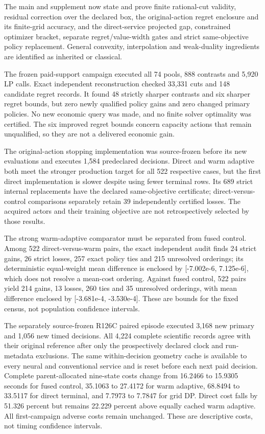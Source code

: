 The main and supplement now state and prove finite rational-cut validity, residual correction over the declared box, the original-action regret enclosure and its finite-grid accuracy, and the direct-service projected gap, constrained optimizer bracket, separate regret/value-width gates and strict same-objective policy replacement. General convexity, interpolation and weak-duality ingredients are identified as inherited or classical.\par
The frozen paid-support campaign executed all 74 pools, 888 contrasts and 5,920 LP calls. Exact independent reconstruction checked 33,331 cuts and 148 candidate regret records. It found 48 strictly sharper contrasts and six sharper regret bounds, but zero newly qualified policy gains and zero changed primary policies. No new economic query was made, and no finite solver optimality was certified. The six improved regret bounds concern capacity actions that remain unqualified, so they are not a delivered economic gain.\par
The original-action stopping implementation was source-frozen before its new evaluations and executes 1,584 predeclared decisions. Direct and warm adaptive both meet the stronger production target for all 522 respective cases, but the first direct implementation is slower despite using fewer terminal rows. Its 689 strict internal replacements have the declared same-objective certificate; direct-versus-control comparisons separately retain 39 independently certified losses. The acquired actors and their training objective are not retrospectively selected by those results.\par
The strong warm-adaptive comparator must be separated from fused control. Among 522 direct-versus-warm pairs, the exact independent audit finds 24 strict gains, 26 strict losses, 257 exact policy ties and 215 unresolved orderings; its deterministic equal-weight mean difference is enclosed by [-7.002e-6, 7.125e-6], which does not resolve a mean-cost ordering. Against fused control, 522 pairs yield 214 gains, 13 losses, 260 ties and 35 unresolved orderings, with mean difference enclosed by [-3.681e-4, -3.530e-4]. These are bounds for the fixed census, not population confidence intervals.\par
The separately source-frozen R126C paired episode executed 3,168 new primary and 1,056 new timed decisions. All 4,224 complete scientific records agree with their original reference after only the prospectively declared clock and run-metadata exclusions. The same within-decision geometry cache is available to every neural and conventional service and is reset before each next paid decision. Complete parent-allocated nine-state costs change from 16.2466 to 15.9305 seconds for fused control, 35.1063 to 27.4172 for warm adaptive, 68.8494 to 33.5117 for direct terminal, and 7.7973 to 7.7847 for grid DP. Direct cost falls by 51.326 percent but remains 22.229 percent above equally cached warm adaptive. All first-campaign adverse costs remain unchanged. These are descriptive costs, not timing confidence intervals.\par

